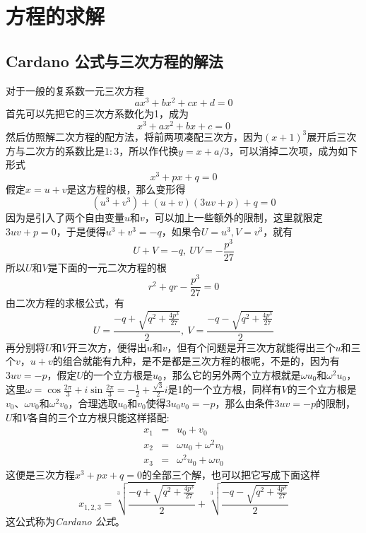 
\section{方程的求解}
\label{sec:solve-high-equation}

\subsection{Cardano 公式与三次方程的解法}
\label{sec:solve-equation-with-3-degree}

对于一般的复系数一元三次方程
\begin{equation*}
  ax^3+bx^2+cx+d=0
\end{equation*}
首先可以先把它的三次方系数化为1，成为
\begin{equation*}
  x^3+ax^2+bx+c=0
\end{equation*}
然后仿照解二次方程的配方法，将前两项凑配三次方，因为$(x+1)^3$展开后三次方与二次方的系数比是$1:3$，所以作代换$y=x+a/3$，可以消掉二次项，成为如下形式
\begin{equation*}
  x^3+px+q=0
\end{equation*}
假定$x=u+v$是这方程的根，那么变形得
\begin{equation*}
  (u^3+v^3)+(u+v)(3uv+p)+q=0
\end{equation*}
因为是引入了两个自由变量$u$和$v$，可以加上一些额外的限制，这里就限定$3uv+p=0$，于是便得$u^3+v^3=-q$，如果令$U=u^3,V=v^3$，就有
\begin{equation*}
  U+V = -q, \  UV=-\frac{p^3}{27}
\end{equation*}
所以$U$和$V$是下面的一元二次方程的根
\begin{equation*}
  r^2+qr-\frac{p^3}{27} = 0
\end{equation*}
由二次方程的求根公式，有
\begin{equation*}
  U = \frac{-q+\sqrt{q^2+\frac{4p^3}{27}}}{2}, \  V = \frac{-q-\sqrt{q^2+\frac{4p^3}{27}}}{2}
\end{equation*}
再分别将$U$和$V$开三次方，便得出$u$和$v$，但有个问题是开三次方就能得出三个$u$和三个$v$，$u+v$的组合就能有九种，是不是都是三次方程的根呢，不是的，因为有$3uv=-p$，假定$U$的一个立方根是$u_0$，那么它的另外两个立方根就是$\omega u_0$和$\omega^2 u_0$，这里$\omega=\cos{\frac{2\pi}{3}}+i\sin{\frac{2\pi}{3}}=-\frac{1}{2}+\frac{\sqrt{3}}{2}i$是1的一个立方根，同样有$V$的三个立方根是$v_0$、$\omega v_0$和$\omega^2 v_0$，合理选取$u_0$和$v_0$使得$3u_0v_0=-p$，那么由条件$3uv=-p$的限制，$U$和$V$各自的三个立方根只能这样搭配:
\begin{eqnarray*}
  x_1 & = & u_0+v_0 \\
  x_2 & = & \omega u_0 + \omega^2 v_0 \\
  x_3 & = & \omega^2 u_0 + \omega v_0
\end{eqnarray*}
这便是三次方程$x^3+px+q=0$的全部三个解，也可以把它写成下面这样
\begin{equation}
  \label{eq:cardano-formula}
  x_{1,2,3} = \sqrt[3]{\frac{-q+\sqrt{q^2+\frac{4p^3}{27}}}{2}} + \sqrt[3]{\frac{-q-\sqrt{q^2+\frac{4p^3}{27}}}{2}}
\end{equation}
这公式称为\emph{Cardano 公式}。


